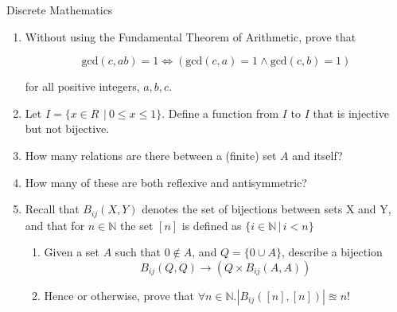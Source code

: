 \documentclass{tripos}  %
\begin{document}
\begin{question}[MockIA,year=2024,paper=1,question=3,author=rrw]{Discrete Mathematics}

  \begin{enumerate}
   
  \item Without using the Fundamental Theorem of Arithmetic, prove that

    \[
    \mbox{gcd}(c,ab) = 1 \Leftrightarrow ( \mbox{gcd}(c,a) = 1 \wedge{} \mbox{gcd}(c,b) = 1)
    \]

    for all positive integers, $a,b,c$.

  \item Let $I = \{ x \in R\, ~|~ 0 \le x \le 1 \}$. Define a function from $I$ to $I$ that is injective but not bijective. 
  \item How many relations are there between a (finite) set $A$ and itself? 
  \item How many of these are both reflexive and antisymmetric? 


  \item Recall that $B_{ij}(X,Y)$ denotes the set of bijections between sets X and Y, and that for $n \in \mathbb{N}$ the set $[n]$ is defined as $\{i \in \mathbb{N}\, |\, i < n\}$
    \begin{enumerate}
    \item Given a set $A$ such that $0 \notin A$, and $Q=\{ 0 \cup A \}$, describe a bijection
      \[
      B_{ij}(Q,Q) \rightarrow ( Q \times B_{ij}(A,A) )
      \]
    \item Hence or otherwise, prove that $\forall n \in \mathbb{N}.| B_{ij}([n], [n]) | \approxeq n!$ 
      \end{enumerate}
  \end{enumerate}
  
\end{question}
\end{document}

